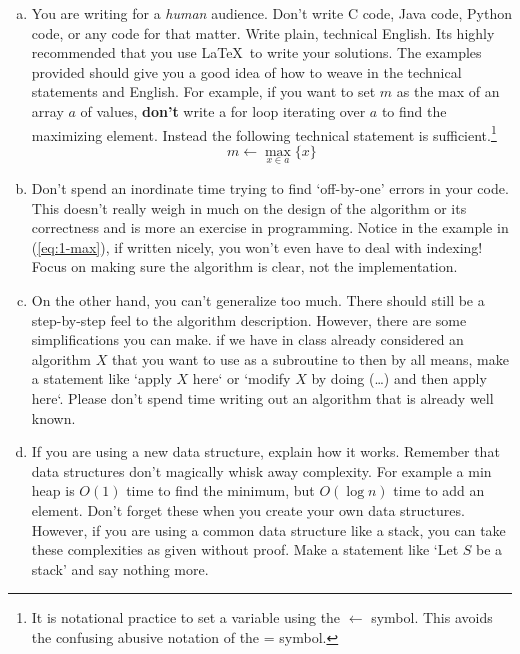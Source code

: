 \documentclass[10pt]{article}
\theoremstyle{plain}
\theoremstyle{definition}
\numberwithin{equation}{section}
\numberwithin{figure}{section}
\begin{document}
\begin{enumerate}[(a)]
\item You are writing for a \emph{human} audience. Don't write C code, Java code, Python code, or any code for that matter. Write plain, technical English. Its highly recommended that you use \LaTeX \ to write your solutions. The examples provided should give you a good idea of how to weave in the technical statements and English. For example, if you want to set $m$ as the max of an array $a$ of values, \textbf{don't} write a for loop iterating over $a$ to find the maximizing element. Instead the following technical statement is sufficient.\footnote{It is notational practice to set a variable using the $\leftarrow$ symbol. This avoids the confusing abusive notation of the = symbol.}
\begin{equation}
m \leftarrow \max_{x \in a} \{ x \}
\label{eq:1-max}
\end{equation}

\item Don't spend an inordinate time trying to find `off-by-one' errors in your code. This doesn't really weigh in much on the design of the algorithm or its correctness and is more an exercise in programming. Notice in the example in (\ref{eq:1-max}), if written nicely, you won't even have to deal with indexing! Focus on making sure the algorithm is clear, not the implementation.

\item On the other hand, you can't generalize too much. There should still be a step-by-step feel to the algorithm description. However, there are some simplifications you can make. if we have in class already considered an algorithm $X$ that you want to use as a subroutine to then by all means, make a statement like `apply $X$ here` or `modify $X$ by doing (\ldots) and then apply here`. Please don't spend time writing out an algorithm that is already well known.

\item If you are using a new data structure, explain how it works. Remember that data structures don't magically whisk away complexity. For example a min heap is $O(1)$ time to find the minimum, but $O(\log n)$ time to add an element. Don't forget these when you create your own data structures. However, if you are using a common data structure like a stack, you can take these complexities as given without proof. Make a statement like `Let $S$ be a stack' and say nothing more.
\end{enumerate}
\end{document}
